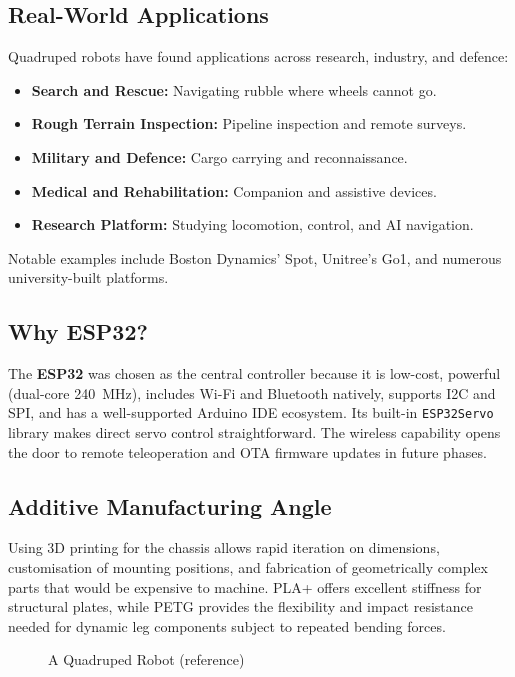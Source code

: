 \documentclass[12pt, a4paper]{article}
\begin{document}
\subsection{Real-World Applications}

Quadruped robots have found applications across research, industry, and defence:
\begin{itemize}[itemsep=3pt]
  \item \textbf{Search and Rescue:} Navigating rubble where wheels cannot go.
  \item \textbf{Rough Terrain Inspection:} Pipeline inspection and remote surveys.
  \item \textbf{Military and Defence:} Cargo carrying and reconnaissance.
  \item \textbf{Medical and Rehabilitation:} Companion and assistive devices.
  \item \textbf{Research Platform:} Studying locomotion, control, and AI navigation.
\end{itemize}

Notable examples include Boston Dynamics' Spot, Unitree's Go1, and numerous
university-built platforms.

\subsection{Why ESP32?}

The \textbf{ESP32} was chosen as the central controller because it is low-cost,
powerful (dual-core 240~MHz), includes Wi-Fi and Bluetooth natively, supports I2C
and SPI, and has a well-supported Arduino IDE ecosystem. Its built-in
\texttt{ESP32Servo} library makes direct servo control straightforward. The
wireless capability opens the door to remote teleoperation and OTA firmware
updates in future phases.

\subsection{Additive Manufacturing Angle}

Using 3D printing for the chassis allows rapid iteration on dimensions,
customisation of mounting positions, and fabrication of geometrically complex
parts that would be expensive to machine. PLA+ offers excellent stiffness for
structural plates, while PETG provides the flexibility and impact resistance
needed for dynamic leg components subject to repeated bending forces.

\begin{figure}[H]
  \centering
  \vspace{10cm}
  \caption{A Quadruped Robot (reference)}
  \label{fig:quadruped_ref}
\end{figure}
\end{document}
